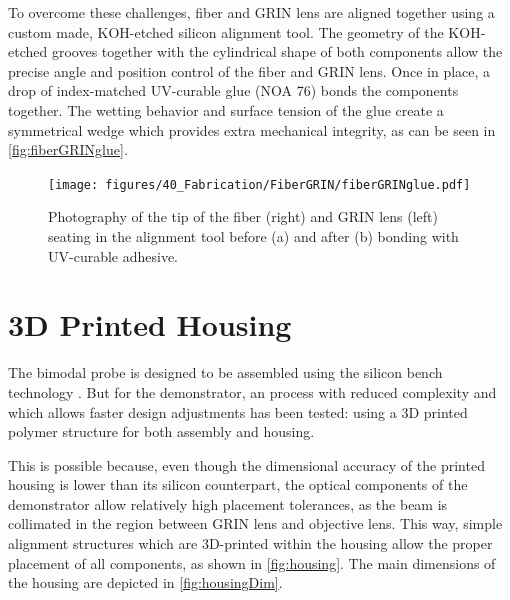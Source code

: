 To overcome these challenges, fiber and GRIN lens are aligned together using a custom made, KOH-etched silicon alignment tool. The geometry of the KOH-etched grooves together with the cylindrical shape of both components allow the precise angle and position control of the fiber and GRIN lens. Once in place, a drop of index-matched UV-curable glue (NOA 76) bonds the components together. The wetting behavior and surface tension of the glue create a symmetrical wedge which provides extra mechanical integrity, as can be seen in \autoref{fig:fiberGRINglue}.

\begin{figure}[h!]\centering \texttt{[image: figures/40\_Fabrication/FiberGRIN/fiberGRINglue.pdf]}
      \caption{Photography of the tip of the fiber (right) and GRIN lens (left) seating in the alignment tool before (a) and after (b) bonding with UV-curable adhesive.}
      \label{fig:fiberGRINglue}
\end{figure}




\section{3D Printed Housing}

The bimodal probe is designed to be assembled using the silicon bench technology \cite{Kretschmer}. But for the demonstrator, an process with reduced complexity and which allows faster design adjustments has been tested: using a 3D printed polymer structure for both assembly and housing.

This is possible because, even though the dimensional accuracy of the printed housing is lower than its silicon counterpart, the optical components of the demonstrator allow relatively high placement tolerances, as the beam is collimated in the region between GRIN lens and objective lens. This way, simple alignment structures which are 3D-printed within the housing allow the proper placement of all components, as shown in \autoref{fig:housing}. The main dimensions of the housing are depicted in \autoref{fig:housingDim}.


